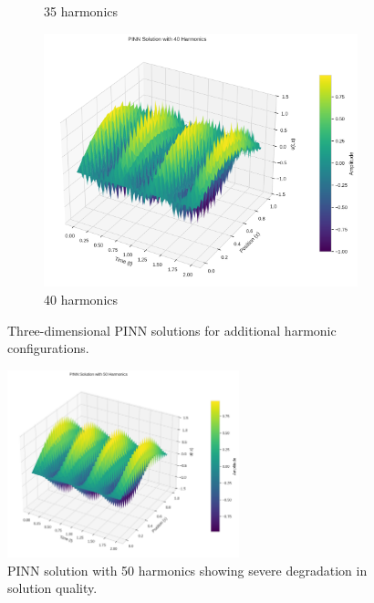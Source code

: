\begin{figure}[H]
\begin{subfigure}[b]{0.32\textwidth}
        \caption{35 harmonics}
    \end{subfigure}
    \hfill
    \begin{subfigure}[b]{0.32\textwidth}
        \centering
        \includegraphics[width=\textwidth]{figures/3d_comparison_pinn_solution_40h.png}
        \caption{40 harmonics}
    \end{subfigure}
    \caption{Three-dimensional PINN solutions for additional harmonic configurations.}
    \label{fig:3d_pinn_additional}
\end{figure}

\begin{figure}[H]
    \centering
    \includegraphics[width=0.6\textwidth]{figures/3d_comparison_pinn_solution_50h.png}
    \caption{PINN solution with 50 harmonics showing severe degradation in solution quality.}
    \label{fig:3d_pinn_50h}
\end{figure}

